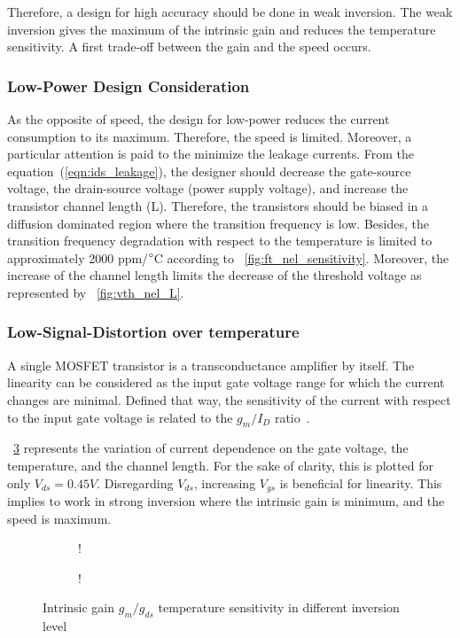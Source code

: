 Therefore, a design for high accuracy should be done in weak inversion. The weak inversion gives the maximum of the intrinsic gain and reduces the temperature sensitivity. A first trade-off between the gain and the speed occurs.

\subsubsection{Low-Power Design Consideration}
As the opposite of speed, the design for low-power reduces the current consumption to its maximum. Therefore, the speed is limited. Moreover, a particular attention is paid to the minimize the leakage currents. From the equation~(\ref{eqn:ids_leakage}), the designer should decrease the gate-source voltage, the drain-source voltage (power supply voltage), and increase the transistor channel length (L). Therefore, the transistors should be biased in a diffusion dominated region where the transition frequency is low. Besides, the transition frequency degradation with respect to the temperature is limited to approximately 2000 ppm/\(\degree \)C according to \figurename~\ref{fig:ft_nel_sensitivity}. Moreover, the increase of the channel length limits the decrease of the threshold voltage as represented by \figurename~\ref{fig:vth_nel_L}.

\subsubsection{Low-Signal-Distortion over temperature}
A single MOSFET transistor is a transconductance amplifier by itself. The linearity can be considered as the input gate voltage range for which the current changes are minimal. Defined that way, the sensitivity of the current with respect to the input gate voltage is related to the \(g_m/I_D \) ratio~\cite{Ou2018a,Ou2017a}.

\figurename~\ref{fig:gm_id} represents the variation of current dependence on the gate voltage, the temperature, and the channel length. For the sake of clarity, this is plotted for only \(V_{ds} = 0.45 V\). Disregarding \(V_{ds}\), increasing \(V_{gs}\) is beneficial for linearity. This implies to work in strong inversion where the intrinsic gain is minimum, and the speed is maximum.
\begin{figure}[!ht]
	\centering
	\begin{subfigure}[b]{0.48\textwidth}
		\resizebox {\textwidth} {!} {
			
		}
		\label{fig:gm_nel_T}
	\end{subfigure}
	\begin{subfigure}[b]{0.48\textwidth}
		\resizebox {\textwidth} {!} {
			
		}
		\label{fig:gm_nel_L}
	\end{subfigure}
	\caption{Intrinsic gain \(g_m/g_{ds} \) temperature sensitivity in different inversion level}
	\label{fig:gm_id}
\end{figure}

